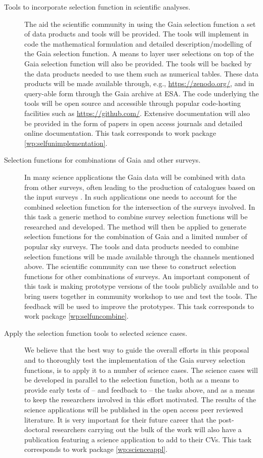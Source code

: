 \begin{description}
    \item[Tools to incorporate selection function in scientific analyses.] The aid the scientific community in using the Gaia selection function a set of data products and tools will be provided. The tools will implement in code the mathematical formulation and detailed description/modelling of the Gaia selection function. A means to layer user selections on top of the Gaia selection function will also be provided. The tools will be backed by the data products needed to use them such as numerical tables. These data products will be made available through, e.g., \url{https://zenodo.org/}, and in query-able form through the Gaia archive at ESA. The code underlying the tools will be open source and accessible through popular code-hosting facilities such as \url{https://github.com/}. Extensive documentation will also be provided in the form of papers in open access journals and detailed online documentation. This task corresponds to work package \ref{wp:selfunimplementation}.
    \item[Selection functions for combinations of Gaia and other surveys.] In many science applications the Gaia data will be combined with data from other surveys, often leading to the production of catalogues based on the input surveys \citep[see for example][]{2019A&A...628A..94A}. In such applications one needs to account for the combined selection function for the intersection of the surveys involved. In this task a generic method to combine survey selection functions will be researched and developed. The method will then be applied to generate selection functions for the combination of Gaia and a limited number of popular sky surveys. The tools and data products needed to combine selection functions will be made available through the channels mentioned above. The scientific community can use these to construct selection functions for other combinations of surveys. An important component of this task is making prototype versions of the tools publicly available and to bring users together in community workshop to use and test the tools. The feedback will be used to improve the prototypes. This task corresponds to work package \ref{wp:selfuncombine}.
    \item[Apply the selection function tools to selected science cases.] We believe that the best way to guide the overall efforts in this proposal and to thoroughly test the implementation of the Gaia survey selection functions, is to apply it to a number of science cases. The science cases will be developed in parallel to the selection function, both as a means to provide early tests of -- and feedback to -- the tasks above, and as a means to keep the researchers involved in this effort motivated. The results of the science applications will be published in the open access peer reviewed literature. It is very important for their future career that the post-doctoral researchers carrying out the bulk of the work will also have a publication featuring a science application to add to their CVs. This task corresponds to work package \ref{wp:scienceappl}.
\end{description}

